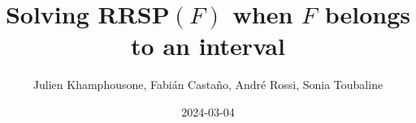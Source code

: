 \documentclass{article}
\begin{document}
     \title{Solving RRSP$(F)$ when $F$ belongs to an interval}
     \author{Julien Khamphousone, Fabi\'an Casta\~no, Andr\'e Rossi, Sonia Toubaline}
     \date{2024-03-04}
     \maketitle
     \def\F{{0.0,0.1142857,0.1466667,1.784,2.6666667,3.2571429,6.2333333,6.8566667}}
\def\gF{{15.09000000000000000000000000000000000000000000000000000000000000000000000000005,15.90142859999999999999999999999999999999999999999999999999999999999999999999998,16.07466670000000000000000000000000000000000000000000000000000000000000000000008,22.37839999999999999999999999999999999999999999999999999999999999999999999999993,24.67333330000000000000000000000000000000000000000000000000000000000000000000005,26.12000000000000000000000000000000000000000000000000000000000000000000000000007,31.32833329999999999999999999999999999999999999999999999999999999999999999999993,2608.29833333333333469224631547452502295702171865108997308438029683053116514202}}
\end{document}
